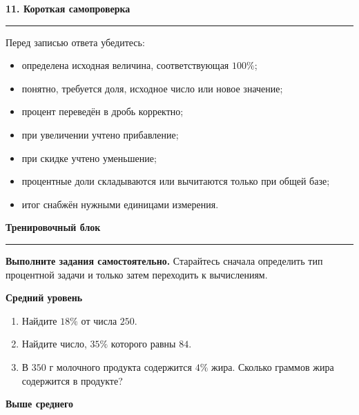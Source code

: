 \documentclass[a4paper,12pt]{article}
\newcommand{\sectiontitle}[1]{%
    \vspace{0.6em}
    {\Large\bfseries\color{darkaccent}#1\par}
    \vspace{0.15em}
    {\color{accent}\rule{\linewidth}{0.6pt}}
    \vspace{0.4em}
}
\newcommand{\subsectiontitle}[1]{%
    \vspace{0.35em}
    {\large\bfseries\color{accent}#1\par}
    \vspace{0.15em}
}
\begin{document}
\sectiontitle{11. Короткая самопроверка}

Перед записью ответа убедитесь:

\begin{itemize}
    \item определена исходная величина, соответствующая \(100\%\);
    \item понятно, требуется доля, исходное число или новое значение;
    \item процент переведён в дробь корректно;
    \item при увеличении учтено прибавление;
    \item при скидке учтено уменьшение;
    \item процентные доли складываются или вычитаются только при общей базе;
    \item итог снабжён нужными единицами измерения.
\end{itemize}


\clearpage
\sectiontitle{Тренировочный блок}

\textbf{Выполните задания самостоятельно.}
Старайтесь сначала определить тип процентной задачи и только затем
переходить к вычислениям.

\subsectiontitle{Средний уровень}

\begin{enumerate}

    \item Найдите \(18\%\) от числа \(250\).

    \item Найдите число, \(35\%\) которого равны \(84\).

    \item В \(350\) г молочного продукта содержится \(4\%\) жира.
    Сколько граммов жира содержится в продукте?

\end{enumerate}

\subsectiontitle{Выше среднего}
\end{document}
